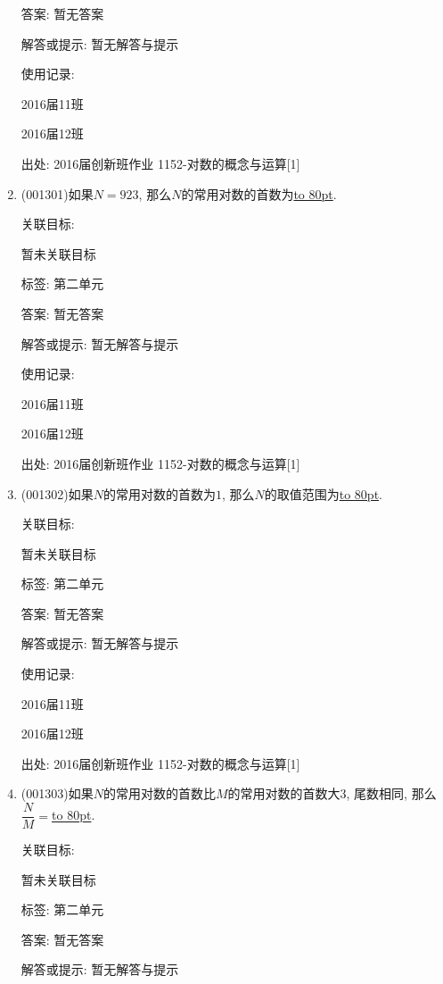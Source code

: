 \documentclass[10pt,a4paper]{article}
\newcommand{\blank}[1]{\underline{\hbox to #1pt{}}}
\begin{document}
\begin{enumerate}[1.]
答案: 暂无答案

解答或提示: 暂无解答与提示

使用记录:

2016届11班			

2016届12班			


出处: 2016届创新班作业	1152-对数的概念与运算[1]
\item { (001301)}如果$N=923$, 那么$N$的常用对数的首数为\blank{80}.


关联目标:

暂未关联目标



标签: 第二单元

答案: 暂无答案

解答或提示: 暂无解答与提示

使用记录:

2016届11班	

2016届12班	


出处: 2016届创新班作业	1152-对数的概念与运算[1]
\item { (001302)}如果$N$的常用对数的首数为$1$, 那么$N$的取值范围为\blank{80}.


关联目标:

暂未关联目标



标签: 第二单元

答案: 暂无答案

解答或提示: 暂无解答与提示

使用记录:

2016届11班	

2016届12班	


出处: 2016届创新班作业	1152-对数的概念与运算[1]
\item { (001303)}如果$N$的常用对数的首数比$M$的常用对数的首数大$3$, 尾数相同, 那么$\dfrac{N}{M}=$\blank{80}.


关联目标:

暂未关联目标



标签: 第二单元

答案: 暂无答案

解答或提示: 暂无解答与提示


\end{enumerate}
\end{document}
